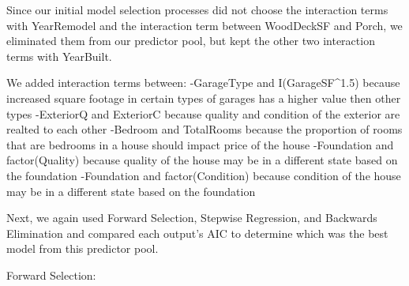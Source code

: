 \documentclass[
]{article}
\newenvironment{Shaded}{\begin{snugshade}}{\end{snugshade}}
\newcommand{\DataTypeTok}[1]{\textcolor[rgb]{0.13,0.29,0.53}{#1}}
\newcommand{\DecValTok}[1]{\textcolor[rgb]{0.00,0.00,0.81}{#1}}
\newcommand{\KeywordTok}[1]{\textcolor[rgb]{0.13,0.29,0.53}{\textbf{#1}}}
\newcommand{\NormalTok}[1]{#1}
\newcommand{\OperatorTok}[1]{\textcolor[rgb]{0.81,0.36,0.00}{\textbf{#1}}}
\newcommand{\OtherTok}[1]{\textcolor[rgb]{0.56,0.35,0.01}{#1}}
\newcommand{\StringTok}[1]{\textcolor[rgb]{0.31,0.60,0.02}{#1}}
\begin{document}
Since our initial model selection processes did not choose the
interaction terms with YearRemodel and the interaction term between
WoodDeckSF and Porch, we eliminated them from our predictor pool, but
kept the other two interaction terms with YearBuilt.

We added interaction terms between: -GarageType and I(GarageSF\^{}1.5)
because increased square footage in certain types of garages has a
higher value then other types -ExteriorQ and ExteriorC because quality
and condition of the exterior are realted to each other -Bedroom and
TotalRooms because the proportion of rooms that are bedrooms in a house
should impact price of the house -Foundation and factor(Quality) because
quality of the house may be in a different state based on the foundation
-Foundation and factor(Condition) because condition of the house may be
in a different state based on the foundation

Next, we again used Forward Selection, Stepwise Regression, and
Backwards Elimination and compared each output's AIC to determine which
was the best model from this predictor pool.

Forward Selection:

\begin{Shaded}
\end{Shaded}
\end{document}
